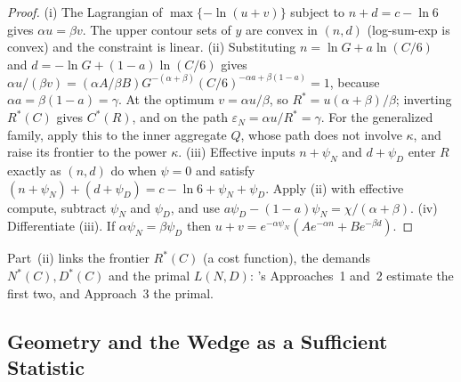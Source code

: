 \begin{proof}
(i) The Lagrangian of $\max\{-\ln(u+v)\}$ subject to $n+d=c-\ln6$ gives $\alpha u=\beta v$. The upper contour sets of
$y$ are convex in $(n,d)$ (log-sum-exp is convex) and the constraint is linear. (ii) Substituting
$n=\ln G+a\ln(C/6)$ and $d=-\ln G+(1-a)\ln(C/6)$ gives $\alpha u/(\beta v)=(\alpha A/\beta B)G^{-(\alpha+\beta)}
(C/6)^{-\alpha a+\beta(1-a)}=1$, because $\alpha a=\beta(1-a)=\gamma$. At the optimum $v=\alpha u/\beta$, so
$R^*=u(\alpha+\beta)/\beta$; inverting $R^*(C)$ gives $C^*(R)$, and on the path $\varepsilon_N=\alpha u/R^*=\gamma$. For the
generalized family, apply this to the inner aggregate $Q$, whose path does not involve $\kappa$, and raise its frontier to
the power $\kappa$.
(iii) Effective inputs $n+\psi_N$ and $d+\psi_D$ enter $R$ exactly as $(n,d)$ do when $\psi=0$ and satisfy
$(n+\psi_N)+(d+\psi_D)=c-\ln6+\psi_N+\psi_D$. Apply (ii) with effective compute, subtract $\psi_N$ and $\psi_D$, and use
$a\psi_D-(1-a)\psi_N=\chi/(\alpha+\beta)$. (iv) Differentiate (iii). If $\alpha\psi_N=\beta\psi_D$ then
$u+v=e^{-\alpha\psi_N}(Ae^{-\alpha n}+Be^{-\beta d})$.
\end{proof}

Part~(ii) links the frontier $R^*(C)$ (a cost function), the demands $N^*(C),D^*(C)$ and the primal $L(N,D)$:
\citet{hoffmann2022training}'s Approaches~1 and~2 estimate the first two, and Approach~3 the primal.

\subsection{Geometry and the Wedge as a Sufficient Statistic}\label{app:geometry}

